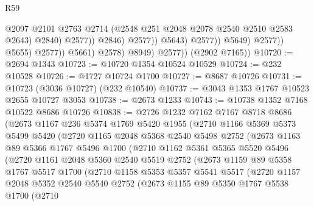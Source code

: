 \begin{lexlean}{R59}
\begin{coremodule}
                                              @2097
                                              @2101
                                              @2763
                                              @2714
                                              (@2548 @251 @2048 @2078 @2540 @2510 @2583 @2643)
                                              @2840)
                                            @2577))
                                        @2846)
                                      @2577))
                                  @5643)
                                @2577))
                            @5649)
                          @2577))
                      @5655)
                    @2577))
                @5661)
              @2578)
            @8949)
          @2577))
      (@2902 @7165))
@10720 := @2694 @1343
@10723 := @10720 @1354 @10524 @10529
@10724 := @232 @10528
@10726 := @1727 @10724 @1700
@10727 := @8687 @10726
@10731 := @10723 (@3036 @10727) (@232 @10540)
@10737 := @3043 @1353 @1767 @10523 @2655 @10727 @3053
@10738 := @2673 @1233
@10743 := @10738 @1352 @7168 @10522 @8686 @10726
@10838 := @2726
    @1232
    @7162
    @7167
    @8718
    @8686
    (@2673
      @1167
      @236
      @5374
      @1769
      @5420
      @1955
      (@2710
        @1166
        @5369
        @5373
        @5499
        @5420
        (@2720
          @1165
          @2048
          @5368
          @2540
          @5498
          @2752
          (@2673
            @1163
            @89
            @5366
            @1767
            @5496
            @1700
            (@2710
              @1162
              @5361
              @5365
              @5520
              @5496
              (@2720
                @1161
                @2048
                @5360
                @2540
                @5519
                @2752
                (@2673
                  @1159
                  @89
                  @5358
                  @1767
                  @5517
                  @1700
                  (@2710
                    @1158
                    @5353
                    @5357
                    @5541
                    @5517
                    (@2720
                      @1157
                      @2048
                      @5352
                      @2540
                      @5540
                      @2752
                      (@2673
                        @1155
                        @89
                        @5350
                        @1767
                        @5538
                        @1700
                        (@2710

\end{coremodule}
\end{lexlean}
